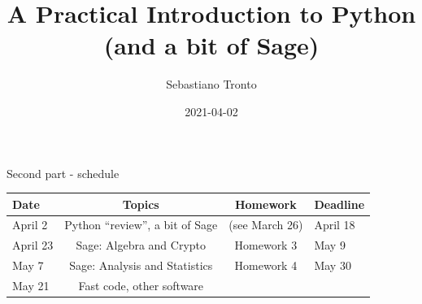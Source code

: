 \documentclass[11pt]{beamer}
\author[\texttt{sebastiano.tronto@uni.lu}]{Sebastiano Tronto}
\title[Python Intro and a bit of Sage]%
{A Practical Introduction to Python (and a bit of Sage)}
\date{2021-04-02}
\begin{document}
\begin{frame}
  \titlepage
\end{frame}

\begin{frame}{Second part - schedule}
  \begin{tabular}{l|c|c|l}
    \textbf{Date} & \textbf{Topics} & \textbf{Homework} & \textbf{Deadline}  \\
    \hline
    April 2   & Python ``review'', a bit of Sage & (see March 26) & April 18 \\
    \hline
    April 23  & Sage: Algebra and Crypto & Homework 3 & May 9                \\
    \hline
    May 7     & Sage: Analysis and Statistics  & Homework 4 & May 30         \\
    \hline
    May 21    & Fast code, other software  &
  \end{tabular}
\end{frame}
\end{document}
